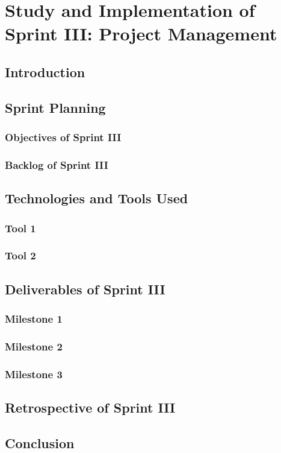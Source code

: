 \documentclass[a4paper,12pt]{report}
\begin{document}
\chapter[Sprint III]{Study and Implementation of Sprint III: Project Management}

\minitoc
\section{Introduction}
\section{Sprint Planning}
\subsection{Objectives of Sprint III}
\subsection{Backlog of Sprint III}
\section{Technologies and Tools Used}
\subsection{Tool 1}
\subsection{Tool 2}
\section{Deliverables of Sprint III}
\subsection{Milestone 1}
\subsection{Milestone 2}
\subsection{Milestone 3}
\section{Retrospective of Sprint III}
\section{Conclusion}
\end{document}
